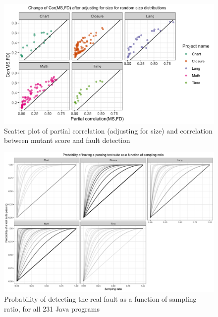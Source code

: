 \documentclass[10pt,letterpaper]{article}
\begin{document}
  \begin{figure}[ht!]
        \centering
        \includegraphics[scale=0.15]{figures/partial_cor_ms_fault_scatter.png}
        \caption{Scatter plot of partial correlation (adjusting for size) and correlation between mutant score and fault detection} 
        \label{fig:partial_cor_ms_fault_scatter}
    \end{figure}



  \begin{figure}[ht!]
        \centering
        \includegraphics[scale=0.1]{figures/passing_suite_prob.png}
        \caption{Probability of detecting the real fault as a function of sampling ratio, for all 231 Java programs}
        \label{fig:par_cor_ms_fd}
    \end{figure}
\end{document}
